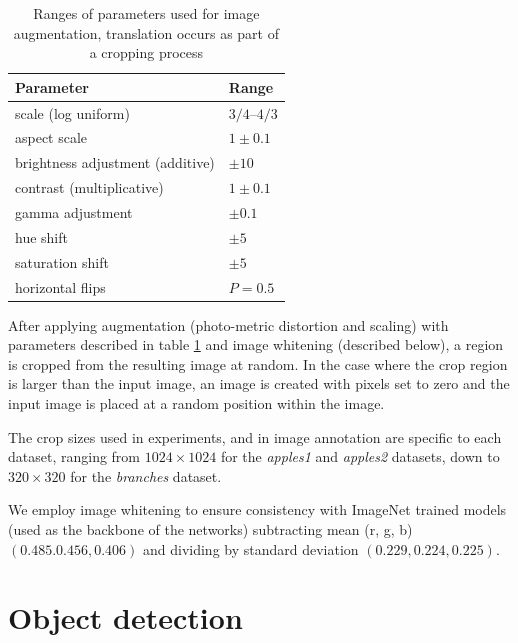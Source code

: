 \begin{table}[h]
  \centering
    \caption{Ranges of parameters used for image augmentation, translation occurs as part of a cropping process}
    
  \begin{tabular}{ l  l }
    Parameter & Range \\
    \toprule
    scale (log uniform) & ${3/4}$--${4/3}$  \\ 
    aspect scale  & $ 1 \pm 0.1 $  \\ 

    brightness adjustment (additive) & $ \pm 10 $ \\ 
    contrast (multiplicative) & $ 1 \pm 0.1 $ \\ 

    gamma adjustment & $ \pm 0.1 $ \\ 

    hue shift & $ \pm 5 $ \\ 
    saturation shift & $ \pm 5 $ \\ 
    
    horizontal flips & $ P = 0.5 $ \\ 
    
    \bottomrule
  \end{tabular}
\label{fig:obj_augmentation}
\end{table}

After applying augmentation (photo-metric distortion and scaling) with parameters described in table \ref{fig:obj_augmentation} and image whitening (described below), a region is cropped from the resulting image at random. In the case where the crop region is larger than the input image, an image is created with pixels set to zero and the input image is placed at a random position within the image.

The crop sizes used in experiments, and in image annotation are specific to each dataset, ranging from $1024\times1024$ for the \emph{apples1} and \emph{apples2} datasets, down to $320\times320$ for the \emph{branches} dataset.

We employ image whitening to ensure consistency with ImageNet trained models (used as the backbone of the networks) subtracting mean (r, g, b) $ (0.485. 0.456, 0.406) $ and dividing by standard deviation $ (0.229, 0.224, 0.225) $.


\section {Object detection}

